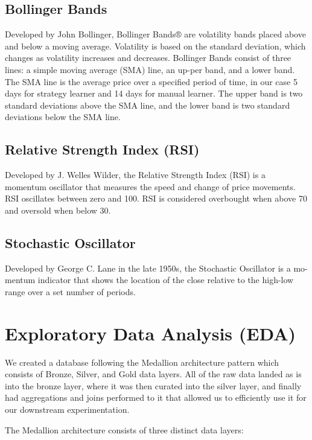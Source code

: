 \documentclass[twocolumn]{article}
\begin{document}
\subsection{Bollinger Bands}
Developed by John Bollinger, Bollinger Bands® are volatility bands placed above and below a moving average. Volatility is based on the standard deviation, which changes as volatility increases and decreases. Bollinger Bands consist of three lines: a simple moving average (SMA) line, an up-per band, and a lower band. The SMA line is the average price over a specified period of time, in our case 5 days for strategy learner and 14 days for manual learner. The upper band is two standard deviations above the SMA line, and the lower band is two standard deviations below the SMA line.~\cite{chartschool_bollinger}

\subsection{Relative Strength Index (RSI)}
Developed by J. Welles Wilder, the Relative Strength Index (RSI) is a momentum oscillator that measures the speed and change of price movements. RSI oscillates between zero and 100. RSI is considered overbought when above 70 and oversold when below 30.~\cite{chartschool_rsi}

\subsection{Stochastic Oscillator}
Developed by George C. Lane in the late 1950s, the Stochastic Oscillator is a mo-mentum indicator that shows the location of the close relative to the high-low range over a set number of periods.~\cite{chartschool_stochastic}


\section{Exploratory Data Analysis (EDA)}
We created a database following the Medallion architecture pattern which consists of Bronze, Silver, and Gold data layers. All of the raw data landed as is into the bronze layer, where it was then curated into the silver layer, and finally had aggregations and joins performed to it that allowed us to efficiently use it for our downstream experimentation.

The Medallion architecture consists of three distinct data layers:
\end{document}
